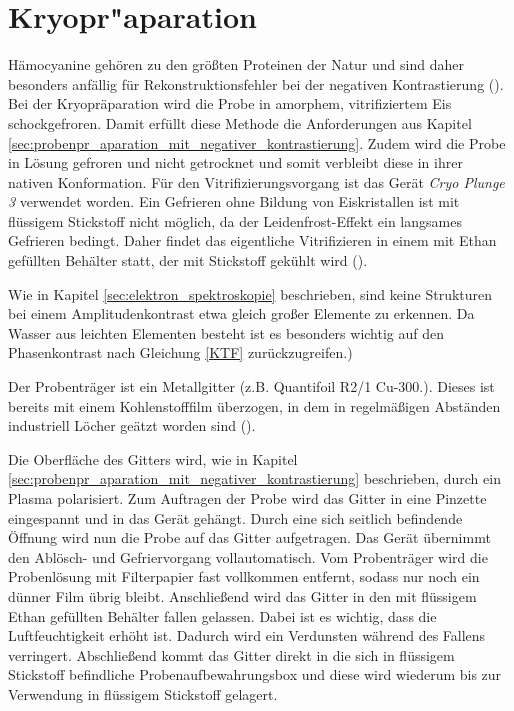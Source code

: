 \section{Kryopr"aparation}
\label{sec:probenpr_aparation_mit_kryopr_aparation}

Hämocyanine gehören zu den größten Proteinen der Natur und sind daher besonders anfällig für Rekonstruktionsfehler bei der negativen Kontrastierung (\cite{christos_diss}).
Bei der Kryopräparation wird die Probe in amorphem, vitrifiziertem Eis schockgefroren.
Damit erfüllt diese Methode die Anforderungen aus Kapitel \ref{sec:probenpr_aparation_mit_negativer_kontrastierung}.
Zudem wird die Probe in Lösung gefroren und nicht getrocknet und somit verbleibt diese in ihrer nativen Konformation.
Für den Vitrifizierungsvorgang ist das Gerät \textit{Cryo Plunge 3} verwendet worden.
Ein Gefrieren ohne Bildung von Eiskristallen ist mit flüssigem Stickstoff nicht möglich, da der Leidenfrost-Effekt ein langsames Gefrieren bedingt.
Daher findet das eigentliche Vitrifizieren in einem mit Ethan gefüllten Behälter statt, der mit Stickstoff gekühlt wird (\cite{bio_TEM}).

Wie in Kapitel \ref{sec:elektron_spektroskopie} beschrieben, sind keine Strukturen bei einem Amplitudenkontrast etwa gleich großer Elemente zu erkennen.
Da Wasser aus leichten Elementen besteht ist es besonders wichtig auf den Phasenkontrast nach Gleichung \eqref{KTF} zurückzugreifen.)

Der Probenträger ist ein Metallgitter (z.B. Quantifoil R2/1 Cu-300.).
Dieses ist bereits mit einem Kohlenstofffilm überzogen, in dem in regelmäßigen Abständen industriell Löcher geätzt worden sind (\cite{grid}).

Die Oberfläche des Gitters wird, wie in Kapitel \ref{sec:probenpr_aparation_mit_negativer_kontrastierung} beschrieben, durch ein Plasma polarisiert.
Zum Auftragen der Probe wird das Gitter in eine Pinzette eingespannt und in das Gerät gehängt.
Durch eine sich seitlich befindende Öffnung wird nun die Probe auf das Gitter aufgetragen.
Das Gerät übernimmt den Ablösch- und Gefriervorgang vollautomatisch.
Vom Probenträger wird die Probenlösung mit Filterpapier fast vollkommen entfernt, sodass nur noch ein dünner Film übrig bleibt.
Anschließend wird das Gitter in den mit flüssigem Ethan gefüllten Behälter fallen gelassen.
Dabei ist es wichtig, dass die Luftfeuchtigkeit erhöht ist.
Dadurch wird ein Verdunsten während des Fallens verringert.
Abschließend kommt das Gitter direkt in die sich in flüssigem Stickstoff befindliche Probenaufbewahrungsbox und diese wird wiederum bis zur Verwendung in flüssigem Stickstoff gelagert.

\FloatBarrier